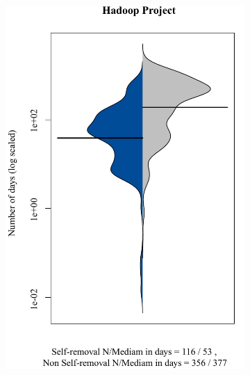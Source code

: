 \begin{figure}[t]
\begin{subfigure}[b]{0.195\textwidth}
		\includegraphics[width=\textwidth]{ben_Hadoop.pdf}
		\label{fig:removal_comparison_hadoop} 
	\end{subfigure}
	\begin{subfigure}[b]{0.191\textwidth}

\end{subfigure}
\end{figure}
